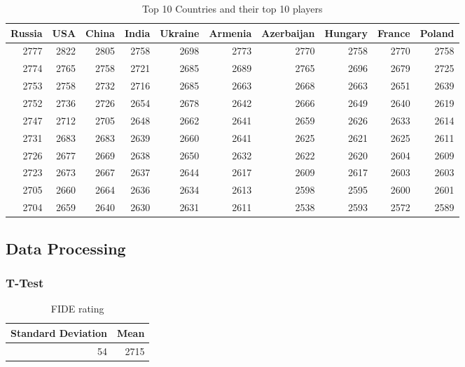 \documentclass[12pt]{article}
\begin{document}
\begin{table}
\begin{center}
\begin{tabular}{rrrrrrrrrr}
Russia & USA & China & India & Ukraine & Armenia & Azerbaijan & Hungary & France & Poland\\
\hline
2777 & 2822 & 2805 & 2758 & 2698 & 2773 & 2770 & 2758 & 2770 & 2758\\
2774 & 2765 & 2758 & 2721 & 2685 & 2689 & 2765 & 2696 & 2679 & 2725\\
2753 & 2758 & 2732 & 2716 & 2685 & 2663 & 2668 & 2663 & 2651 & 2639\\
2752 & 2736 & 2726 & 2654 & 2678 & 2642 & 2666 & 2649 & 2640 & 2619\\
2747 & 2712 & 2705 & 2648 & 2662 & 2641 & 2659 & 2626 & 2633 & 2614\\
2731 & 2683 & 2683 & 2639 & 2660 & 2641 & 2625 & 2621 & 2625 & 2611\\
2726 & 2677 & 2669 & 2638 & 2650 & 2632 & 2622 & 2620 & 2604 & 2609\\
2723 & 2673 & 2667 & 2637 & 2644 & 2617 & 2609 & 2617 & 2603 & 2603\\
2705 & 2660 & 2664 & 2636 & 2634 & 2613 & 2598 & 2595 & 2600 & 2601\\
2704 & 2659 & 2640 & 2630 & 2631 & 2611 & 2538 & 2593 & 2572 & 2589\\
\end{tabular}
    \caption{Top 10 Countries and their top 10 players}
\end{center}
\end{table}


\subsection{Data Processing}
\subsubsection{T-Test}
\begin{table}
\begin{center}
\begin{tabular}{rr}
Standard Deviation & Mean\\
\hline
54 & 2715\\
\end{tabular}
    \caption{FIDE rating}
\end{center}
\end{table}
\end{document}
